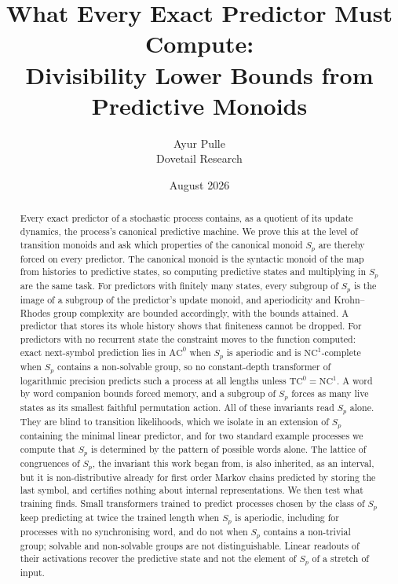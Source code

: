 \documentclass[10pt]{article}
\title{What Every Exact Predictor Must Compute:\\ Divisibility Lower Bounds from Predictive Monoids}
\author{Ayur Pulle\\ \small{Dovetail Research}}
\date{\small August 2026}
\theoremstyle{definition}
\theoremstyle{remark}
\begin{document}
\maketitle


\begin{abstract}
Every exact predictor of a stochastic process contains, as a quotient
of its update dynamics, the process's canonical predictive machine.
We prove this at the level of transition monoids and ask which
properties of the canonical monoid $S_p$ are thereby forced on every
predictor.  The canonical monoid is the syntactic monoid of the map
from histories to predictive states, so computing predictive states
and multiplying in $S_p$ are the same task.  For predictors with
finitely many states, every subgroup of $S_p$ is the image of a
subgroup of the predictor's update monoid, and aperiodicity and
Krohn--Rhodes group complexity are bounded accordingly, with the
bounds attained.  A predictor that stores its whole history shows
that finiteness cannot be dropped.  For predictors with no recurrent
state the constraint moves to the function computed: exact
next-symbol prediction lies in $\mathrm{AC}^0$ when $S_p$ is
aperiodic and is $\mathrm{NC}^1$-complete when $S_p$ contains a
non-solvable group, so no constant-depth transformer of logarithmic
precision predicts such a process at all lengths unless
$\mathrm{TC}^0=\mathrm{NC}^1$.  A word by word companion bounds
forced memory, and a subgroup of $S_p$ forces as many live states as
its smallest faithful permutation action.  All of these invariants
read $S_p$ alone.  They are blind to transition likelihoods, which we
isolate in an extension of $S_p$ containing the minimal linear
predictor, and for two standard example processes we compute that
$S_p$ is determined by the pattern of possible words alone.  The
lattice of congruences of $S_p$, the invariant this work began from,
is also inherited, as an interval, but it is non-distributive already
for first order Markov chains predicted by storing the last symbol,
and certifies nothing about internal representations.  We then test
what training finds.  Small transformers trained to predict processes
chosen by the class of $S_p$ keep predicting at twice the trained
length when $S_p$ is aperiodic, including for processes with no
synchronising word, and do not when $S_p$ contains a non-trivial
group; solvable and non-solvable groups are not distinguishable.  Linear readouts of
their activations recover the predictive state and not the element of
$S_p$ of a stretch of input.
\end{abstract}
\end{document}
